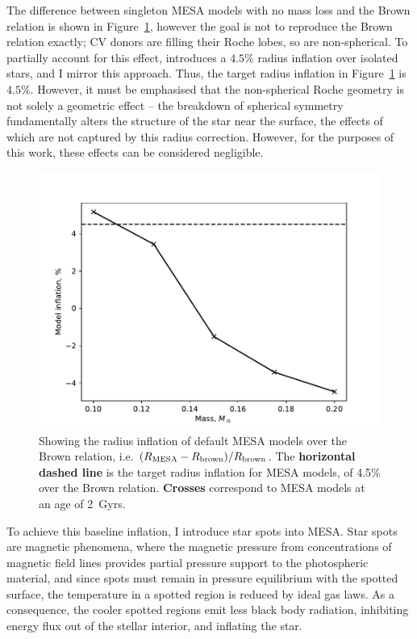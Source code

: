 The difference between singleton MESA models with no mass loss and the Brown relation is shown in Figure~\ref{fig:modelling:MESA inflation over Brown relation}, however the goal is not to reproduce the Brown relation exactly; CV donors are filling their Roche lobes, so are non-spherical.
To partially account for this effect, \citet{knigge11} introduces a $4.5\%$ radius inflation over isolated stars, and I mirror this approach. Thus, the target radius inflation in Figure~\ref{fig:modelling:MESA inflation over Brown relation} is $4.5\%$.
However, it must be emphasised that the non-spherical Roche geometry is not solely a geometric effect -- the breakdown of spherical symmetry fundamentally alters the structure of the star near the surface, the effects of which are not captured by this radius correction. However, for the purposes of this work, these effects can be considered negligible.
\begin{figure}
    \centering
    \includegraphics[width=\textwidth]{figures/modelling/MESA_inflation_over_brown.pdf}
    \caption{Showing the radius inflation of default MESA models over the Brown relation, i.e. $(R_{\rm MESA} - R_{\rm brown}) / R_{\rm brown}$. The {\bf horizontal dashed line} is the target radius inflation for MESA models, of 4.5\% over the Brown relation. {\bf Crosses} correspond to MESA models at an age of 2~Gyrs.}
    \label{fig:modelling:MESA inflation over Brown relation}
\end{figure}

To achieve this baseline inflation, I introduce star spots into MESA. Star spots are magnetic phenomena, where the magnetic pressure from concentrations of magnetic field lines provides partial pressure support to the photospheric material, and since spots must remain in pressure equilibrium with the spotted surface, the temperature in a spotted region is reduced by ideal gas laws. As a consequence, the cooler spotted regions emit less black body radiation, inhibiting energy flux out of the stellar interior, and inflating the star.

